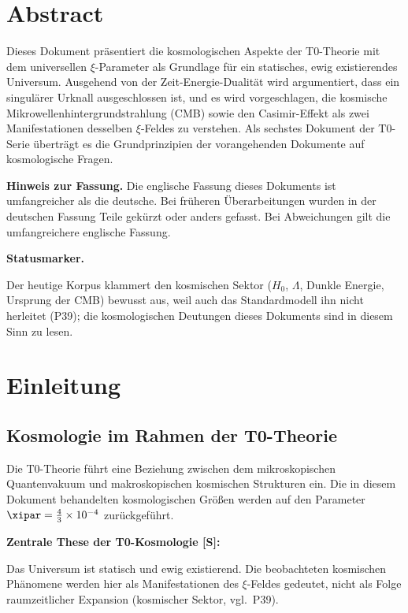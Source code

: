 \section*{Abstract}
		Dieses Dokument präsentiert die kosmologischen Aspekte der T0-Theorie mit dem universellen $\xi$-Parameter als Grundlage für ein statisches, ewig existierendes Universum. Ausgehend von der Zeit-Energie-Dualität wird argumentiert, dass ein singulärer Urknall ausgeschlossen ist, und es wird vorgeschlagen, die kosmische Mikrowellenhintergrundstrahlung (CMB) sowie den Casimir-Effekt als zwei Manifestationen desselben $\xi$-Feldes zu verstehen. Als sechstes Dokument der T0-Serie überträgt es die Grundprinzipien der vorangehenden Dokumente auf kosmologische Fragen.

	\medskip\noindent\textbf{Hinweis zur Fassung.} Die englische Fassung dieses Dokuments ist umfangreicher als die deutsche. Bei früheren Überarbeitungen wurden in der deutschen Fassung Teile gekürzt oder anders gefasst. Bei Abweichungen gilt die umfangreichere englische Fassung.


\medskip\noindent\textbf{Statusmarker.}


\noindent Der heutige Korpus klammert den kosmischen Sektor ($H_0$, $\Lambda$, Dunkle Energie, Ursprung der CMB) bewusst aus, weil auch das Standardmodell ihn nicht herleitet (P39); die kosmologischen Deutungen dieses Dokuments sind in diesem Sinn zu lesen.

	
	
	\section{Einleitung}
	
	\subsection{Kosmologie im Rahmen der T0-Theorie}
	
	Die T0-Theorie führt eine Beziehung zwischen dem mikroskopischen Quantenvakuum und makroskopischen kosmischen Strukturen ein. Die in diesem Dokument behandelten kosmologischen Größen werden auf den Parameter $\xipar = \frac{4}{3} \times 10^{-4}$ zurückgeführt.
	
	\begin{keyresult}
		\textbf{Zentrale These der T0-Kosmologie [S]:}
		
		Das Universum ist statisch und ewig existierend. Die beobachteten kosmischen Phänomene werden hier als Manifestationen des $\xi$-Feldes gedeutet, nicht als Folge raumzeitlicher Expansion (kosmischer Sektor, vgl.\ P39).
	\end{keyresult}
	
